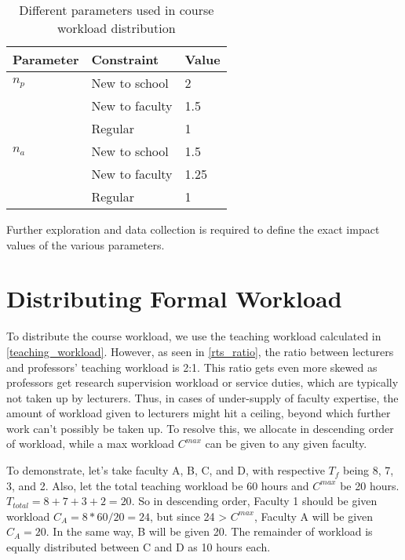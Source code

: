 \begin{table}
    \centering
    \begin{tabular}{|l|l|l|}
        \hline
        Parameter & Constraint     & Value \\
        \hline
        \(n_p\)   & New to school  & 2     \\
                  & New to faculty & 1.5   \\
                  & Regular        & 1     \\
        \hline
        \(n_a\)   & New to school  & 1.5   \\
                  & New to faculty & 1.25  \\
                  & Regular        & 1     \\
        \hline
    \end{tabular}
    \caption{Different parameters used in course workload distribution}
    \label{course_weightages}
\end{table}

Further exploration and data collection is required to define the exact impact values of the various parameters.

\section{Distributing Formal Workload}
\label{section:distributing_formal_workload}

To distribute the course workload, we use the teaching workload calculated in \autoref{teaching_workload}. However, as seen in \autoref{rts_ratio}, the ratio between lecturers and professors' teaching workload is 2:1. This ratio gets even more skewed as professors get research supervision workload or service duties, which are typically not taken up by lecturers. Thus, in cases of under-supply of faculty expertise, the amount of workload given to lecturers might hit a ceiling, beyond which further work can't possibly be taken up. To resolve this, we allocate in descending order of workload, while a max workload \(C^{max}\) can be given to any given faculty.

To demonstrate, let's take faculty A, B, C, and D, with respective \(T_f\) being 8, 7, 3, and 2. Also, let the total teaching workload be 60 hours and \(C^{max}\) be 20 hours. \(T_{total}= 8+7+3+2 = 20\). So in descending order, Faculty 1 should be given workload \(C_A = 8*60/20=24\), but since 24 > \(C^{max}\), Faculty A will be given \(C_A = 20\). In the same way, B will be given 20. The remainder of workload is equally distributed between C and D as 10 hours each.

